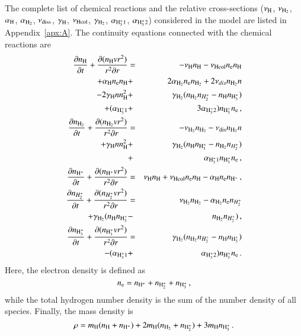 \documentclass{aa}
\def\hhh{{\rm H_3^+}}
\def\hh{{\rm H_2}}
\def\nh{n_{\rm H}}
\def\nhh{n_{\rm H_2}}
\def\nhhh{n_{\rm H_3^+}}
\def\nhp{n_{\rm H^+}}
\def\nhhp{n_{H_2^+}}
\def\ne{n_{\rm e}}
\begin{document}
The complete list of chemical reactions and the relative cross-sections ($\nu_{\rm H}$, $\nu_{\hh}$, $\alpha_{\rm H}$, $\alpha_{\hh}$, $\nu_{\rm diss}$, $\gamma_{\rm H}$, $\nu_{\rm Hcol}$, $\gamma_{\hh}$, $\alpha_{\hhh1}$, $\alpha_{\hhh2}$) considered in the model are listed in Appendix~\ref{apx:A}. The continuity equations connected with the chemical reactions are
\begin{eqnarray}\label{eqn:species}
\frac{\partial \nh}{\partial t}+\frac{\partial(\nh
vr^2)}{r^2\partial r} &=& -\nu_{\rm H}\nh -
\nu_{\rm Hcol}\ne\nh  \nonumber \\
+ \alpha_{\rm H}\ne\nh &+& 2\alpha_{\hh}\ne\nhh +
2\nu_{dis}\nhh n \nonumber \\
- 2\gamma_{\rm H}n\nh^2 &+& \gamma_{\hh}(\nhh\nhhp-\nh\nhhh) \nonumber \\
+ (\alpha_{\hhh1} &+& 3\alpha_{\hhh2})\nhhh\ne\,, \\
\frac{\partial \nhh}{\partial t}+\frac{\partial(\nhh
vr^2)}{r^2\partial r} &=&
-\nu_{\hh}\nhh - \nu_{\rm dis}\nhh n \nonumber \\
+ \gamma_{\rm H}n\nh^2 &+&
\gamma_{\hh}(\nh\nhhh - \nhh\nhhp) \nonumber \\
&+& \alpha_{\hhh1}\nhhh\ne\,, \\
\frac{\partial \nhp}{\partial t}+\frac{\partial(\nhp
vr^2)}{r^2\partial r} &=& \nu_{\rm H}\nh +
\nu_{\rm Hcol}\ne\nh \nonumber - \alpha_{\rm H}\ne\nhp\,, \\
\frac{\partial \nhhp}{\partial t}+\frac{\partial(\nhhp
vr^2)}{r^2\partial r} &=&
\nu_{\hh}\nhh - \alpha_{\hh}\ne\nhhp \nonumber \\
+ \gamma_{\hh}(\nh\nhhh &-& \nhh\nhhp)\,, \\
\frac{\partial \nhhh}{\partial t}+\frac{\partial(\nhhh
vr^2)}{r^2\partial r} &=&
\gamma_{\hh}(\nhh\nhhp-\nh\nhhh) \nonumber \\
- (\alpha_{\hhh1}&+&\alpha_{\hhh2})\nhhh\ne\,.
\end{eqnarray}
Here, the electron density is defined as
%
\begin{equation}
\ne = \nhp + n_{\rm H_2^+} + \nhhh\,,
\end{equation}
%
while the total hydrogen number density is the sum of the number density of all species. Finally, the mass density is
%
\begin{equation}\label{rho}
\rho = m_{\rm H}(n_{\rm H}+n_{\rm H^+}) + 2m_{\rm H}(n_{\rm H_2}+n_{\rm H_2^+}) + 3m_{\rm H}n_{\rm H_3^+}\,.
\end{equation}
%
\end{document}
